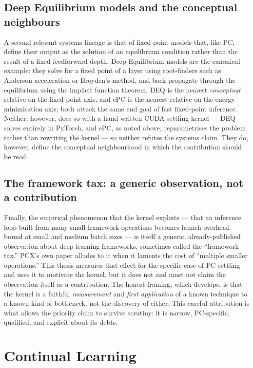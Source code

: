 \subsection{Deep Equilibrium models and the conceptual neighbours}

A second relevant systems lineage is that of fixed-point models that, like PC, define their
output as the solution of an equilibrium condition rather than the result of a fixed
feedforward depth. Deep Equilibrium models \citep{bai2019deq} are the canonical example:
they solve for a fixed point of a layer using root-finders such as Anderson acceleration or
Broyden's method, and back-propagate through the equilibrium using the implicit function
theorem. DEQ is the nearest \emph{conceptual} relative on the fixed-point axis, and ePC
\citep{goemaere2025epc} is the nearest relative on the energy-minimisation axis; both attack
the same end goal of fast fixed-point inference. Neither, however, does so with a
hand-written CUDA settling kernel --- DEQ solves entirely in PyTorch, and ePC, as noted
above, reparametrises the problem rather than rewriting the kernel --- so neither refutes the
systems claim. They do, however, define the conceptual neighbourhood in which the
contribution should be read.

\subsection{The framework tax: a generic observation, not a contribution}

Finally, the empirical phenomenon that the kernel exploits --- that an inference loop built
from many small framework operations becomes launch-overhead-bound at small and medium batch
sizes --- is itself a generic, already-published observation about deep-learning frameworks,
sometimes called the ``framework tax.'' PCX's own paper alludes to it when it laments the
cost of ``multiple smaller operations.'' This thesis measures that effect for the specific
case of PC settling and uses it to motivate the kernel, but it does not and must not claim
the observation itself as a contribution. The honest framing, which 
develops, is that the kernel is a faithful \emph{measurement} and \emph{first application} of
a known technique to a known kind of bottleneck, not the discovery of either. This careful
attribution is what allows the priority claim to survive scrutiny: it is narrow,
PC-specific, qualified, and explicit about its debts.

\section{Continual Learning}

